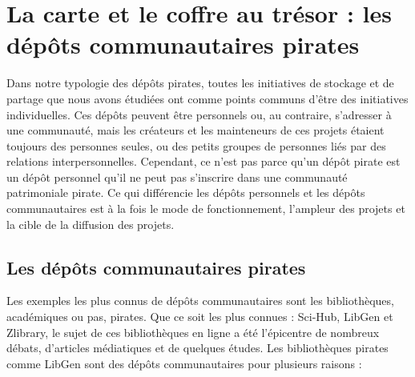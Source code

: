 \section{La carte et le coffre au trésor : les dépôts communautaires pirates}

Dans notre typologie des dépôts pirates, toutes les initiatives de stockage et de partage que nous avons étudiées ont comme points communs d'être des initiatives individuelles. Ces dépôts peuvent être personnels ou, au contraire, s'adresser à une communauté, mais les créateurs et les mainteneurs de ces projets étaient toujours des personnes seules, ou des petits groupes de personnes liés par des relations interpersonnelles. Cependant, ce n'est pas parce qu'un dépôt pirate est un dépôt personnel qu'il ne peut pas s'inscrire dans une communauté patrimoniale pirate. Ce qui différencie les dépôts personnels et les dépôts communautaires est à la fois le mode de fonctionnement, l'ampleur des projets et la cible de la diffusion des projets. 

\subsection*{Les dépôts communautaires pirates}

Les exemples les plus connus de dépôts communautaires sont les bibliothèques, académiques ou pas, pirates. Que ce soit les plus connues : Sci-Hub, LibGen et Zlibrary, le sujet de ces bibliothèques en ligne a été l'épicentre de nombreux débats, d'articles médiatiques et de quelques études. Les bibliothèques pirates comme LibGen sont des dépôts communautaires pour plusieurs raisons : 

